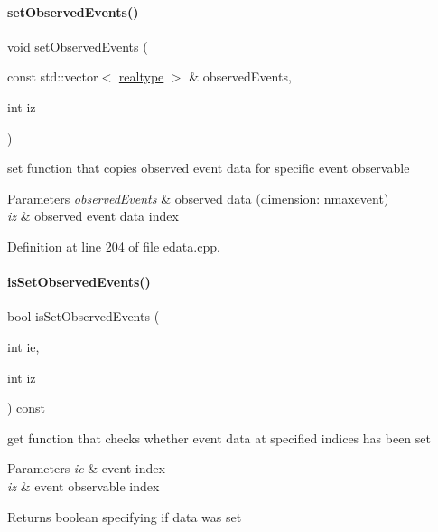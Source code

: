 \paragraph{\texorpdfstring{set\+Observed\+Events()}{setObservedEvents()}\hspace{0.1cm}{\footnotesize\ttfamily [2/2]}}
{\footnotesize\ttfamily void set\+Observed\+Events (\begin{DoxyParamCaption}\item[{const std\+::vector$<$ \mbox{\hyperlink{namespaceamici_a1bdce28051d6a53868f7ccbf5f2c14a3}{realtype}} $>$ \&}]{observed\+Events,  }\item[{int}]{iz }\end{DoxyParamCaption})}

set function that copies observed event data for specific event observable


\begin{DoxyParams}{Parameters}
{\em observed\+Events} & observed data (dimension\+: nmaxevent) \\
\hline
{\em iz} & observed event data index \\
\hline
\end{DoxyParams}


Definition at line 204 of file edata.\+cpp.

\mbox{\label{classamici_1_1_exp_data_a7270ea1362212e4dc344e24dc01b70ee}} 
\paragraph{\texorpdfstring{is\+Set\+Observed\+Events()}{isSetObservedEvents()}}
{\footnotesize\ttfamily bool is\+Set\+Observed\+Events (\begin{DoxyParamCaption}\item[{int}]{ie,  }\item[{int}]{iz }\end{DoxyParamCaption}) const}

get function that checks whether event data at specified indices has been set


\begin{DoxyParams}{Parameters}
{\em ie} & event index \\
\hline
{\em iz} & event observable index \\
\hline
\end{DoxyParams}
\begin{DoxyReturn}{Returns}
boolean specifying if data was set 
\end{DoxyReturn}


